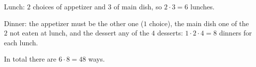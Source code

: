Lunch: $2$ choices of appetizer and $3$ of main dish, so $2\cdot3=6$ lunches.

Dinner: the appetizer must be the other one ($1$ choice), the main dish one of the $2$ not eaten at lunch, and the dessert any of the $4$ desserts: $1\cdot2\cdot4=8$ dinners for each lunch.

In total there are $6\cdot8=\boxed{48}$ ways.
